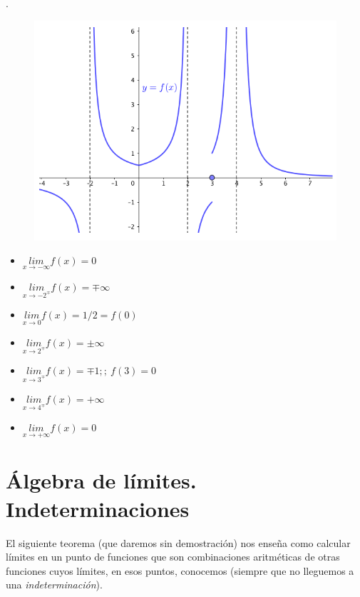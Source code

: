 	   
	   \begin{ejem}.
	   	
	   	\begin{figure}[H]
			\centering
			\includegraphics[width=0.8
			\textwidth]{imagenes/imagenes03/T03IM05.png}
			\end{figure}
		
	   	 	\begin{multicols}{2}
	   	 		\begin{itemize}
	   	 			\item $\underset {x\to -\infty}{lim}{f(x)}=0  $
	   	 			\item $\underset {x\to -2^{\mp}}{lim}{f(x)}=\mp \infty  $
	   	 			\item $\underset {x\to 0}{lim}{f(x)}=1/2=f(0)  $
	   	 			\item $\underset {x\to 2^{\mp}}{lim}{f(x)}=\pm \infty  $
	   	 			\item $\underset {x \to 3^{\mp}}{lim}{f(x)}=\mp 1; ;\ f(3)=0  $
	   	 			\item $\underset {x\to 4^{\mp}}{lim}{f(x)}=+\infty  $
	   	 			\item $\underset {x\to +\infty}{lim}{f(x)}=0  $
	   	 		\end{itemize}	
	   	 	\end{multicols}

	   \end{ejem}
	   
	   \section{Álgebra de límites. Indeterminaciones}
	   
		El siguiente teorema (que daremos sin demostración) nos enseña como calcular límites en un punto de funciones que son combinaciones aritméticas de otras funciones cuyos límites, en esos puntos, conocemos (siempre que no lleguemos a una \emph{indeterminación}).
		

